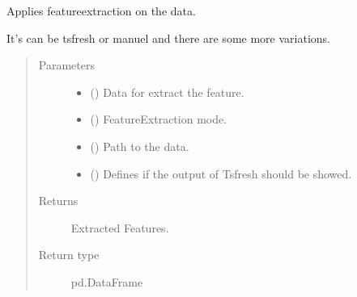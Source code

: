 \documentclass[letterpaper,10pt,english]{sphinxmanual}
\begin{document}

\begin{fulllineitems}
\label{\detokenize{anoog.io:anoog.io.data_io.feature_extraction}}
\sphinxAtStartPar
Applies feature\sphinxhyphen{}extraction on the data.

\sphinxAtStartPar
It’s can be tsfresh or manuel and there are some more variations.
\begin{quote}\begin{description}
\item[{Parameters}] \leavevmode\begin{itemize}
\item {} 
\sphinxAtStartPar
{} () \textendash{} Data for extract the feature.

\item {} 
\sphinxAtStartPar
{} ({\hyperref[\detokenize{anoog.io:anoog.io.data_io.extraction_mode}]{}}) \textendash{} Feature\sphinxhyphen{}Extraction mode.

\item {} 
\sphinxAtStartPar
{} () \textendash{} Path to the data.

\item {} 
\sphinxAtStartPar
{} (\sphinxstyleliteralemphasis{\sphinxupquote{, }}) \textendash{} Defines if the output of Tsfresh should be showed.

\end{itemize}

\item[{Returns}] \leavevmode
\sphinxAtStartPar
Extracted Features.

\item[{Return type}] \leavevmode
\sphinxAtStartPar
pd.DataFrame

\end{description}\end{quote}

\end{fulllineitems}
\end{document}
